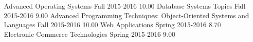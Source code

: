 \begin{grades}
    \begin{gradesgrouping}[Fall 2015-2016]
            {Advanced Operating Systems}
            {Fall}
            {2015-2016}
            {10.00}
            {Database Systems Topics}
            {Fall}
            {2015-2016}
            {9.00}
            {Advanced Programming Techniques: Object-Oriented Systems and Languages}
            {Fall}
            {2015-2016}
            {10.00}
          {Web Applications}
          {Spring}
          {2015-2016}
          {8.70}
          {Electronic Commerce Technologies}
          {Spring}
          {2015-2016}
          {9.00}
    \end{gradesgrouping}
\end{grades}
